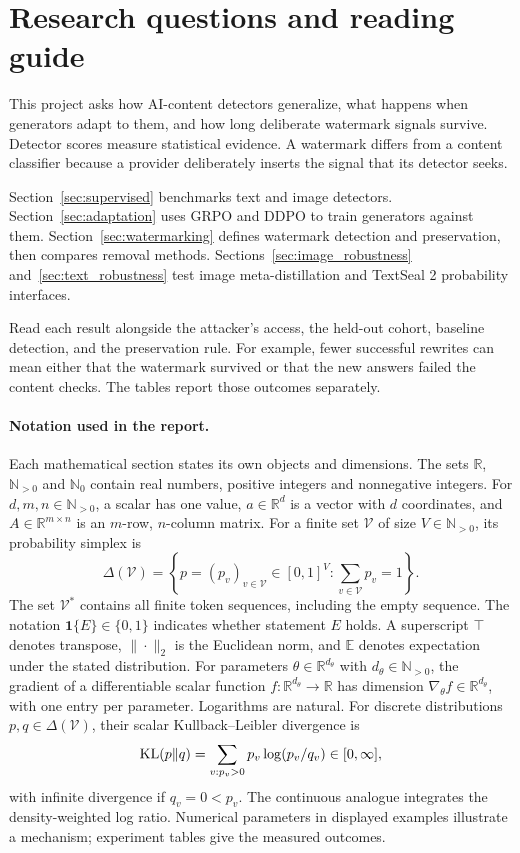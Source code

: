 \section{Research questions and reading guide}
This project asks how AI-content detectors generalize, what happens when generators adapt to them, and how long deliberate watermark signals survive. Detector scores measure statistical evidence. A watermark differs from a content classifier because a provider deliberately inserts the signal that its detector seeks.

Section~\ref{sec:supervised} benchmarks text and image detectors. Section~\ref{sec:adaptation} uses GRPO and DDPO to train generators against them. Section~\ref{sec:watermarking} defines watermark detection and preservation, then compares removal methods. Sections~\ref{sec:image_robustness} and~\ref{sec:text_robustness} test image meta-distillation and TextSeal 2 probability interfaces.

Read each result alongside the attacker's access, the held-out cohort, baseline detection, and the preservation rule. For example, fewer successful rewrites can mean either that the watermark survived or that the new answers failed the content checks. The tables report those outcomes separately.

\paragraph{Notation used in the report.}
Each mathematical section states its own objects and dimensions. The sets $\mathbb R$, $\mathbb N_{>0}$ and $\mathbb N_0$ contain real numbers, positive integers and nonnegative integers. For $d,m,n\in\mathbb N_{>0}$, a scalar has one value, $a\in\mathbb R^d$ is a vector with $d$ coordinates, and $A\in\mathbb R^{m\times n}$ is an $m$-row, $n$-column matrix. For a finite set $\mathcal V$ of size $V\in\mathbb N_{>0}$, its probability simplex is
\begin{equation}
\label{eq:probability-simplex}
 \Delta(\mathcal V)=
 \left\{p=(p_v)_{v\in\mathcal V}\in[0,1]^V:
             \sum_{v\in\mathcal V}p_v=1\right\}.
\end{equation}
The set $\mathcal V^*$ contains all finite token sequences, including the empty sequence. The notation $\mathbf1\{E\}\in\{0,1\}$ indicates whether statement $E$ holds. A superscript $\top$ denotes transpose, $\|\cdot\|_2$ is the Euclidean norm, and $\mathbb E$ denotes expectation under the stated distribution. For parameters $\theta\in\mathbb R^{d_\theta}$ with $d_\theta\in\mathbb N_{>0}$, the gradient of a differentiable scalar function $f:\mathbb R^{d_\theta}\to\mathbb R$ has dimension $\nabla_\theta f\in\mathbb R^{d_\theta}$, with one entry per parameter. Logarithms are natural. For discrete distributions $p,q\in\Delta(\mathcal V)$, their scalar Kullback--Leibler divergence is
\begin{equation}
\label{eq:discrete-kl}
 \operatorname{KL}(p\Vert q)=\sum_{v:p_v>0}p_v\log(p_v/q_v)\in[0,\infty],
\end{equation}
with infinite divergence if $q_v=0<p_v$. The continuous analogue integrates the density-weighted log ratio. Numerical parameters in displayed examples illustrate a mechanism; experiment tables give the measured outcomes.
